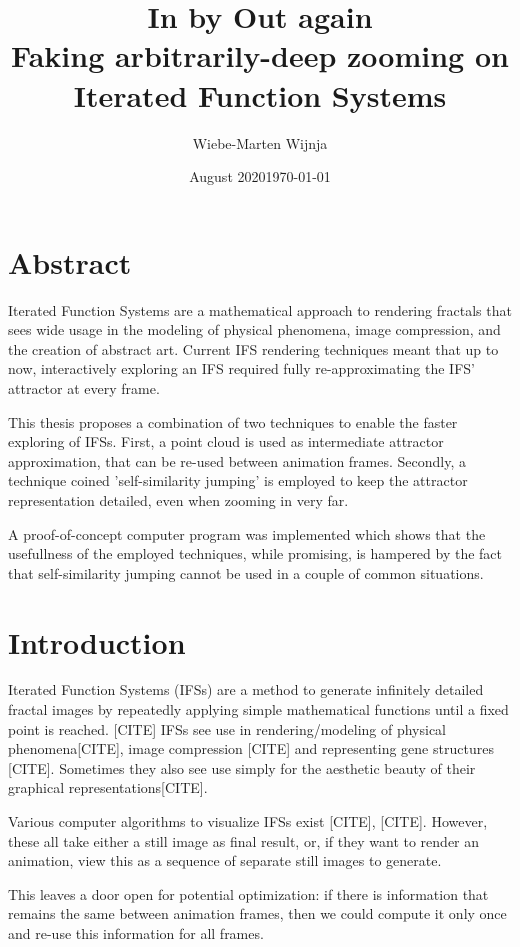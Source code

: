 \documentclass[11pt]{article}
\date{August 2020}
\author{Wiebe-Marten Wijnja}
\date{\today}
\title{\Huge In by Out again\\\medskip
\large Faking arbitrarily-deep zooming on Iterated Function Systems}
\begin{document}
\maketitle
\setcounter{tocdepth}{4}
\tableofcontents

\listoftodos


\section{Abstract}
\label{sec:org9c8bb6e}

Iterated Function Systems are a mathematical approach to rendering fractals that sees wide usage in the modeling of physical phenomena, 
image compression, and the creation of abstract art.
Current IFS rendering techniques meant that up to now, interactively exploring an IFS required fully re-approximating the IFS' attractor at every frame.

This thesis proposes a combination of two techniques to enable the faster exploring of IFSs.
First, a point cloud is used as intermediate attractor approximation, that can be re-used between animation frames.
Secondly, a technique coined 'self-similarity jumping' is employed to keep the attractor representation detailed, even when zooming in very far.

A proof-of-concept computer program was implemented which shows that the usefullness of the employed techniques, while promising, 
is hampered by the fact that self-similarity jumping cannot be used in a couple of common situations.

\section{Introduction}
\label{sec:org1bd7991}

Iterated Function Systems (IFSs) are a method to generate infinitely detailed fractal images 
by repeatedly applying simple mathematical functions until a fixed point is reached. [CITE]
IFSs see use in rendering/modeling of physical phenomena[CITE], image compression [CITE] and representing gene structures [CITE].
Sometimes they also see use simply for the aesthetic beauty of their graphical representations[CITE].

Various computer algorithms to visualize IFSs exist [CITE], [CITE].
However, these all take either a still image as final result, or, if they want to render an animation,
view this as a sequence of separate still images to generate.

This leaves a door open for potential optimization: if there is information that remains the same between animation frames, 
then we could compute it only once and re-use this information for all frames.
\end{document}

